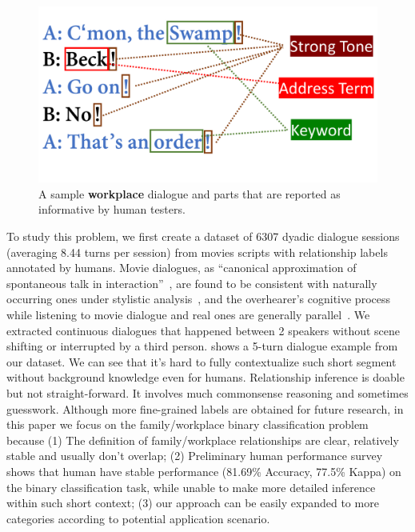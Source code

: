 \begin{figure}[t!]
	\centering
	\includegraphics[width=0.85\columnwidth]{instinct.pdf}
	\caption{A sample \textbf{workplace} dialogue and parts that are 
reported as informative by human testers. }
	\label{fig:instinct}
\end{figure}
To study this problem, we first create a dataset of 6307 dyadic dialogue 
sessions (averaging 8.44 turns per session) from movies scripts with relationship labels annotated by humans. 
Movie dialogues, as ``canonical approximation of spontaneous 
talk in interaction''~\cite{canonical}, are found to be 
consistent with naturally occurring ones under stylistic analysis~\cite{FSC}, and the 
overhearer's cognitive process while listening to movie dialogue and real ones
are generally parallel~\cite{overhearer}. We extracted continuous
dialogues that happened between 2 speakers without scene shifting or interrupted
by a third person. 
 shows a 5-turn dialogue example from our dataset. 
We can see that it's hard to fully contextualize such short segment 
without background knowledge even for humans.
Relationship inference is doable but not straight-forward. 
It involves much commonsense reasoning and sometimes guesswork. 
Although more fine-grained labels are obtained for
future research, in this paper we focus on the family/workplace binary classification 
problem because (1) The definition of family/workplace relationships are clear, relatively
stable and usually don't overlap; (2) Preliminary human performance survey shows that human 
have stable performance (81.69\% Accuracy, 77.5\% Kappa) on the binary classification task, 
while unable to make more detailed inference within such short context; 
(3) our approach can be easily expanded to more categories according to potential application scenario.


